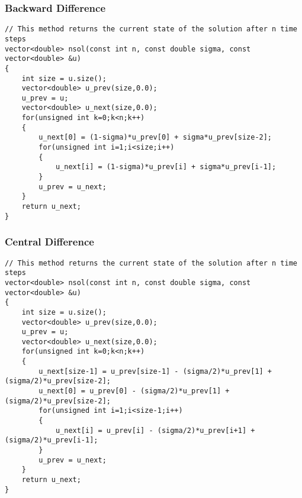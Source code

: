 \documentclass[11pt]{article}
\begin{document}
\subsubsection{Backward Difference}
\label{sec:orgc39fc6f}
\begin{verbatim}
// This method returns the current state of the solution after n time steps
vector<double> nsol(const int n, const double sigma, const vector<double> &u)
{
    int size = u.size();
    vector<double> u_prev(size,0.0);
    u_prev = u;
    vector<double> u_next(size,0.0);
    for(unsigned int k=0;k<n;k++)
    {
        u_next[0] = (1-sigma)*u_prev[0] + sigma*u_prev[size-2];
        for(unsigned int i=1;i<size;i++)
        {
            u_next[i] = (1-sigma)*u_prev[i] + sigma*u_prev[i-1];
        }
        u_prev = u_next;
    }
    return u_next;
}
\end{verbatim}
\subsubsection{Central Difference}
\label{sec:orge0084b3}
\begin{verbatim}
// This method returns the current state of the solution after n time steps
vector<double> nsol(const int n, const double sigma, const vector<double> &u)
{
    int size = u.size();
    vector<double> u_prev(size,0.0);
    u_prev = u;
    vector<double> u_next(size,0.0);
    for(unsigned int k=0;k<n;k++)
    {
        u_next[size-1] = u_prev[size-1] - (sigma/2)*u_prev[1] + (sigma/2)*u_prev[size-2];
        u_next[0] = u_prev[0] - (sigma/2)*u_prev[1] + (sigma/2)*u_prev[size-2];
        for(unsigned int i=1;i<size-1;i++)
        {
            u_next[i] = u_prev[i] - (sigma/2)*u_prev[i+1] + (sigma/2)*u_prev[i-1];
        }
        u_prev = u_next;
    }
    return u_next;
}
\end{verbatim}
\end{document}
